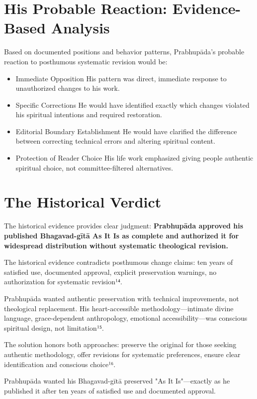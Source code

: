 \documentclass[11pt,twoside]{book}
\begin{document}
\section*{His Probable Reaction: Evidence-Based Analysis}
\label{sec:org06aa5ed}

Based on documented positions and behavior patterns, Prabhupāda's probable reaction to posthumous systematic revision would be:
\begin{itemize}
\item Immediate Opposition
\label{sec:org7574825}
His pattern was direct, immediate response to unauthorized changes to his work.
\item Specific Corrections
\label{sec:org19e2466}
He would have identified exactly which changes violated his spiritual intentions and required restoration.
\item Editorial Boundary Establishment
\label{sec:org666ff4a}
He would have clarified the difference between correcting technical errors and altering spiritual content.
\item Protection of Reader Choice
\label{sec:orgbda8c93}
His life work emphasized giving people authentic spiritual choice, not committee-filtered alternatives.
\end{itemize}
\section*{The Historical Verdict}
\label{sec:orge811690}

The historical evidence provides clear judgment: \textbf{\textbf{Prabhupāda approved his published Bhagavad-gītā As It Is as complete and authorized it for widespread distribution without systematic theological revision.}}

The historical evidence contradicts posthumous change claims: ten years of satisfied use, documented approval, explicit preservation warnings, no authorization for systematic revision¹⁴.

Prabhupāda wanted authentic preservation with technical improvements, not theological replacement. His heart-accessible methodology—intimate divine language, grace-dependent anthropology, emotional accessibility—was conscious spiritual design, not limitation¹⁵.

The solution honors both approaches: preserve the original for those seeking authentic methodology, offer revisions for systematic preferences, ensure clear identification and conscious choice¹⁶.

Prabhupāda wanted his Bhagavad-gītā preserved "As It Is"—exactly as he published it after ten years of satisfied use and documented approval.
\end{document}
